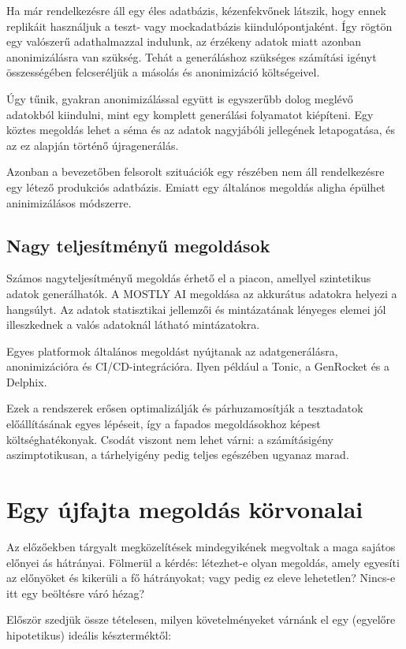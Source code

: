 \documentclass[
    parspace,
    noindent,
    nohyp,
]{elteiktdk}[2023/04/10]
\begin{document}
Ha már rendelkezésre áll egy éles adatbázis, kézenfekvőnek látszik,
hogy ennek replikáit használjuk a teszt- vagy mockadatbázis kiindulópontjaként.
Így rögtön egy valószerű adathalmazzal indulunk,
az érzékeny adatok miatt azonban anonimizálásra van szükség.
Tehát a generáláshoz szükséges számítási igényt összességében
felcseréljük a másolás és anonimizáció költségeivel.

Úgy tűnik, gyakran anonimizálással együtt is egyszerűbb dolog meglévő adatokból kiindulni,
mint egy komplett generálási folyamatot kiépíteni.
Egy köztes megoldás lehet a séma és az adatok nagyjábóli jellegének letapogatása,
és az ez alapján történő újragenerálás.

Azonban a bevezetőben felsorolt szituációk egy részében nem áll rendelkezésre egy létező produkciós adatbázis.
Emiatt egy általános megoldás aligha épülhet aninimizálásos módszerre.

\subsection{Nagy teljesítményű megoldások}

Számos nagyteljesítményű megoldás érhető el a piacon, amellyel szintetikus adatok generálhatók. A MOSTLY AI megoldása az akkurátus adatokra helyezi a hangsúlyt. Az adatok statisztikai jellemzői és mintázatának lényeges elemei jól illeszkednek a valós adatoknál látható mintázatokra.

Egyes platformok általános megoldást nyújtanak az adatgenerálásra, anonimizációra és CI/CD-integrációra.
Ilyen például a Tonic, a GenRocket és a Delphix.

Ezek a rendszerek erősen optimalizálják és párhuzamosítják a tesztadatok előállításának egyes lépéseit,
így a fapados megoldásokhoz képest költséghatékonyak.
Csodát viszont nem lehet várni: a számításigény aszimptotikusan,
a tárhelyigény pedig teljes egészében ugyanaz marad.

\section{Egy újfajta megoldás körvonalai}

Az előzőekben tárgyalt megközelítések mindegyikének megvoltak a maga sajátos előnyei ás hátrányai.
Fölmerül a kérdés: létezhet-e olyan megoldás, amely egyesíti az előnyöket és kikerüli a fő hátrányokat;
vagy pedig ez eleve lehetetlen?
Nincs-e itt egy beöltésre váró hézag?

Először szedjük össze tételesen, milyen követelményeket várnánk el
egy (egyelőre hipotetikus) ideális készterméktől:
\end{document}
